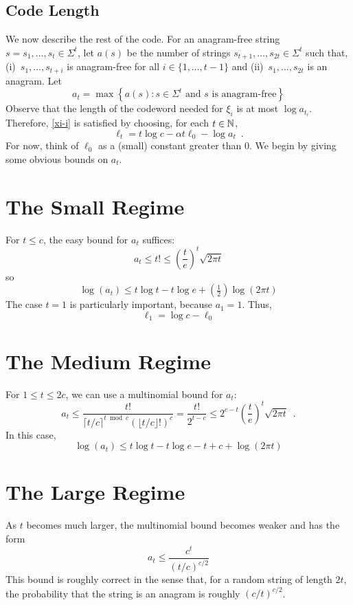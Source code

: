 \documentclass{patmorin}
\newcommand{\ceil}[1]{\lceil #1\rceil}
\newcommand{\floor}[1]{\lfloor #1\rfloor}
\begin{document}
\subsection{Code Length}

We now describe the rest of the code.  For an anagram-free string $s=s_1,\ldots,s_t\in \Sigma^{t}$, let $a(s)$ be the number of strings $s_{t+1},\ldots,s_{2t}\in\Sigma^t$ such that, (i)~$s_1,\ldots,s_{t+i}$ is anagram-free for all $i\in\{1,\ldots,t-1\}$ and (ii)~$s_1,\ldots,s_{2t}$ is an anagram.  Let 
\[
   a_t = \max\left\{a(s) : \text{$s\in \Sigma^t$ and $s$ is anagram-free} \right\}
\]
Observe that the length of the codeword needed for $\xi_i$ is at most $\log a_{t_i}$.  Therefore, \eqref{xi-i} is satisfied by choosing, for each $t\in \mathbb{N}$,
\[
   \ell_t = t\log c -\alpha t\ell_0 -  \log a_t   \enspace .
\]
For now, think of $\ell_0$ as a (small) constant greater than 0.  We begin by giving some obvious bounds on $a_t$.

\section{The Small Regime}

For $t \le c$, the easy bound for $a_t$ suffices:
\[
    a_t \le t! \le \left(\frac{t}{e}\right)^t\sqrt{2\pi t}
\]
so
\[  \log(a_t) \le t\log t - t\log e + (\tfrac{1}{2})\log(2\pi t) \]
The case $t=1$ is particularly important, because $a_1=1$.  Thus,
\[  \ell_1 = \log c - \ell_0 \]


\section{The Medium Regime}

For $1\le t\le 2c$, we can use a multinomial bound for $a_t$:
\[
  a_t \le \frac{t!}{\ceil{t/c}^{t\bmod c}\left(\floor{t/c}!\right)^c}
       = \frac{t!}{2^{t-c}}
      \le 2^{c-t}\left(\frac{t}{e}\right)^t\sqrt{2\pi t} \enspace .
\]
In this case,
\[ \log(a_t) \le t\log t - t\log e - t + c + \log(2\pi t) \]

\section{The Large Regime}

As $t$ becomes much larger, the multinomial bound becomes weaker and has the form
\[
  a_t \le \frac{c^t}{(t/c)^{c/2}}
\]
This bound is roughly correct in the sense that, for a random string of length $2t$, the probability that the string is an anagram is roughly $(c/t)^{c/2}$.
\end{document}
